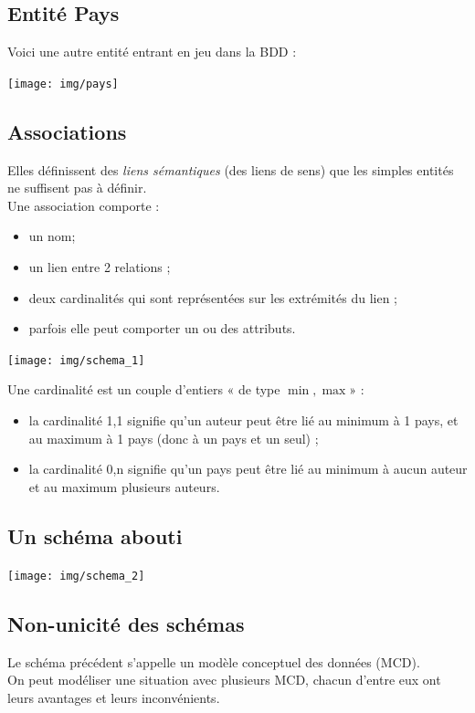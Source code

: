 \documentclass[10pt,firamath,cours]{nsi}
\begin{document}
\subsection{Entité Pays}
Voici une autre entité entrant en jeu dans la BDD :
\begin{center}
\texttt{[image: img/pays]}
\end{center}


\subsection{Associations}
Elles définissent des \textit{liens sémantiques} (des liens de sens)	 que les simples entités ne suffisent pas à définir.\\

Une association comporte :
\begin{itemize}
	\item	un nom;
    \item 	un lien entre 2 relations ;
	\item	deux cardinalités qui sont représentées sur les extrémités du lien ;
    \item 	parfois elle peut comporter un ou des attributs.
\end{itemize}

\begin{exemple}[]
    \begin{center}
        \texttt{[image: img/schema\_1]}
        \end{center}
        Une cardinalité est un couple d'entiers « de type $\min, \max$» :
        \begin{itemize}
            \item	la cardinalité 1,1 signifie qu'un auteur peut être lié au minimum à 1 pays, et au maximum à 1 pays (donc à un pays et un seul) ;
            \item	la cardinalité 0,n signifie qu'un pays peut être lié au minimum à aucun auteur et au maximum plusieurs auteurs.
        \end{itemize}   
\end{exemple}


\subsection{Un schéma abouti}
\begin{center}
 \texttt{[image: img/schema\_2]}
 \end{center}

\subsection{Non-unicité des schémas}
    Le schéma précédent s'appelle un modèle conceptuel des données (MCD).\\
	On peut modéliser une situation avec plusieurs MCD, chacun d'entre eux ont leurs avantages et leurs inconvénients.
\end{document}
